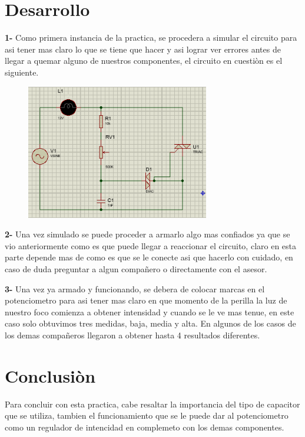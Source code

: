 \documentclass[12pt,a4paper]{article}
\begin{document}
\section{Desarrollo}
\textbf{1-} Como primera instancia de la practica, se procedera a simular el circuito para asi tener mas claro lo que se tiene que hacer y asi lograr ver errores antes de llegar a quemar alguno de nuestros componentes, el circuito en cuestiòn es el siguiente.
\begin{figure}[h!]
\centering
\includegraphics[width=8cm]{Practica3.jpg} 
\end{figure}

\textbf{2-} Una vez simulado se puede proceder a armarlo algo mas confiados ya que se vio anteriormente como es que puede llegar a reaccionar el circuito, claro en esta parte depende mas de como es que se le conecte asi que hacerlo con cuidado, en caso de duda preguntar a algun compañero o directamente con el asesor.
\newpage

\textbf{3-} Una vez ya armado y funcionando, se debera de colocar marcas en el potenciometro para asi tener mas claro en que momento de la perilla la luz de nuestro foco comienza a obtener intensidad y cuando se le ve mas tenue, en este caso solo obtuvimos tres medidas, baja, media y alta. En algunos de los casos de los demas compañeros llegaron a obtener hasta 4 resultados diferentes.

\section{Conclusiòn}
Para concluir con esta practica, cabe resaltar la importancia del tipo de capacitor que se utiliza, tambien el funcionamiento que se le puede dar al potenciometro como un regulador de intencidad en complemeto con los demas componentes.  
\end{document}
